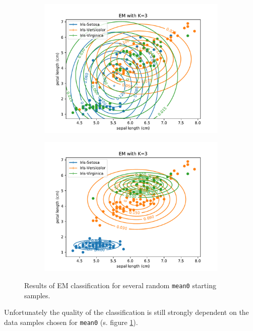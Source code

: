 \documentclass{article}
\begin{document}
\begin{figure}[!ht]
{\begin{subfigure}{0.6\textwidth}
	\includegraphics[width=\textwidth]{./Figures/2_2_EM_randinit2}
	\end{subfigure}
	\begin{subfigure}{0.6\textwidth}
	\includegraphics[width=\textwidth]{./Figures/2_2_EM_randinit3}
	\end{subfigure}
	}	
	\caption{Results of EM classification for several random \texttt{mean0} starting samples.}
	\label{2_2_EM_rand_init}
\end{figure}

Unfortunately the quality of the classification is still strongly dependent on the data samples chosen for \texttt{mean0} (s. figure \ref{2_2_EM_rand_init}).
\end{document}
